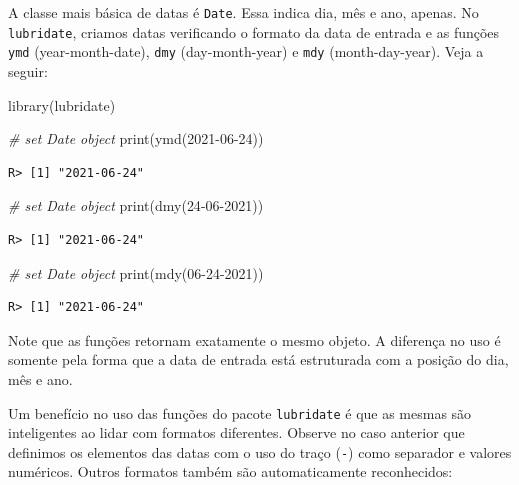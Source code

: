 \documentclass[
  11pt,
]{book}
\newenvironment{Shaded}{\begin{snugshade}}{\end{snugshade}}
\newcommand{\CommentTok}[1]{\textcolor[rgb]{0.37,0.37,0.37}{\textit{#1}}}
\newcommand{\FunctionTok}[1]{\textcolor[rgb]{0,0,0}{#1}}
\newcommand{\NormalTok}[1]{#1}
\newcommand{\StringTok}[1]{\textcolor[rgb]{0.5,0.5,0.5}{#1}}
\begin{document}
A classe mais básica de datas é \texttt{Date}. Essa indica dia, mês e ano, apenas. No \texttt{lubridate}, criamos datas verificando o formato da data de entrada e as funções \texttt{ymd} (year-month-date), \texttt{dmy} (day-month-year) e \texttt{mdy} (month-day-year). Veja a seguir:   

\begin{Shaded}
\begin{Highlighting}[]
\FunctionTok{library}\NormalTok{(lubridate)}

\CommentTok{\# set Date object}
\FunctionTok{print}\NormalTok{(}\FunctionTok{ymd}\NormalTok{(}\StringTok{\textquotesingle{}2021{-}06{-}24\textquotesingle{}}\NormalTok{))}
\end{Highlighting}
\end{Shaded}

\begin{verbatim}
R> [1] "2021-06-24"
\end{verbatim}

\begin{Shaded}
\begin{Highlighting}[]
\CommentTok{\# set Date object}
\FunctionTok{print}\NormalTok{(}\FunctionTok{dmy}\NormalTok{(}\StringTok{\textquotesingle{}24{-}06{-}2021\textquotesingle{}}\NormalTok{))}
\end{Highlighting}
\end{Shaded}

\begin{verbatim}
R> [1] "2021-06-24"
\end{verbatim}

\begin{Shaded}
\begin{Highlighting}[]
\CommentTok{\# set Date object}
\FunctionTok{print}\NormalTok{(}\FunctionTok{mdy}\NormalTok{(}\StringTok{\textquotesingle{}06{-}24{-}2021\textquotesingle{}}\NormalTok{))}
\end{Highlighting}
\end{Shaded}

\begin{verbatim}
R> [1] "2021-06-24"
\end{verbatim}

Note que as funções retornam exatamente o mesmo objeto. A diferença no uso é somente pela forma que a data de entrada está estruturada com a posição do dia, mês e ano.

Um benefício no uso das funções do pacote \texttt{lubridate} é que as mesmas são inteligentes ao lidar com formatos diferentes. Observe no caso anterior que definimos os elementos das datas com o uso do traço (\texttt{-}) como separador e valores numéricos. Outros formatos também são automaticamente reconhecidos:
\end{document}
